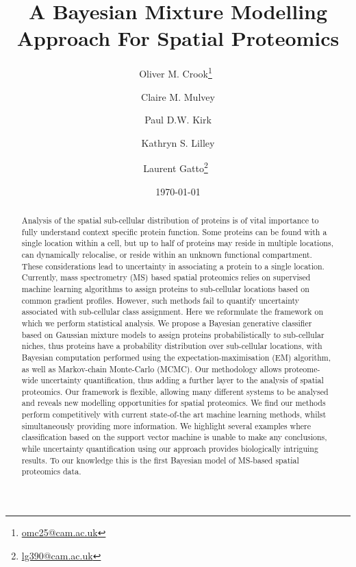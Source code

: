 \documentclass[12pt,english]{article}\usepackage[]{graphicx}\usepackage[]{color}
\begin{document}
\author[1,2,3]{Oliver M. Crook\thanks{\url{omc25@cam.ac.uk}}~}
\author[2]{Claire M. Mulvey}
\author[3]{Paul D.W. Kirk}
\author[2]{Kathryn S. Lilley}
\author[1,2]{Laurent Gatto\thanks{\url{lg390@cam.ac.uk}}~}





\title{A Bayesian Mixture Modelling Approach For Spatial Proteomics}

\date{\small \today}

\maketitle
\linenumbers
\begin{abstract}
  Analysis of the spatial sub-cellular distribution of proteins is of
  vital importance to fully understand context specific protein
  function. Some proteins can be found with a single location within a
  cell, but up to half of proteins may reside in multiple locations,
  can dynamically relocalise, or reside within an unknown functional
  compartment. These considerations lead to uncertainty in associating
  a protein to a single location. Currently, mass spectrometry (MS)
  based spatial proteomics relies on supervised machine learning
  algorithms to assign proteins to sub-cellular locations based on
  common gradient profiles. However, such methods fail to quantify
  uncertainty associated with sub-cellular class assignment. Here we
  reformulate the framework on which we perform statistical
  analysis. We propose a Bayesian generative classifier based on
  Gaussian mixture models to assign proteins probabilistically to
  sub-cellular niches, thus proteins have a probability distribution
  over sub-cellular locations, with Bayesian computation
  performed using the expectation-maximisation (EM) algorithm, as well
  as Markov-chain Monte-Carlo (MCMC). Our methodology allows
  proteome-wide uncertainty quantification, thus adding a further
  layer to the analysis of spatial proteomics. Our framework is
  flexible, allowing many different systems to be analysed and reveals
  new modelling opportunities for spatial proteomics. We find our
  methods perform competitively with current state-of-the art
  machine learning methods, whilst simultaneously providing more
  information. We highlight several examples where classification
  based on the support vector machine is unable to make any
  conclusions, while uncertainty quantification using our approach provides
  biologically intriguing results.  To our knowledge this is the first
  Bayesian model of MS-based spatial proteomics data.
\end{abstract}
\end{document}

